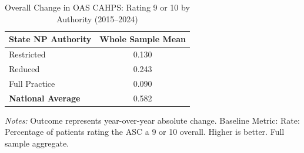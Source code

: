 \begin{table}[htbp]
    \centering
    \caption{Overall Change in OAS CAHPS: Rating 9 or 10 by Authority (2015--2024)}
    \label{tab:d_oas_rating_9_10_full}
    \vspace{0.2cm}
    \begin{tabular}{lc}
        \toprule
        \textbf{State NP Authority} & \textbf{Whole Sample Mean} \\
        \midrule
        Restricted & 0.130 \\
        Reduced & 0.243 \\
        Full Practice & 0.090 \\
        \midrule
        \textbf{National Average} & 0.582 \\
        \bottomrule
    \end{tabular}
    \vspace{0.1cm}
    \begin{minipage}{0.6\textwidth}
        \footnotesize \textit{Notes:} Outcome represents year-over-year absolute change. Baseline Metric: Rate: Percentage of patients rating the ASC a 9 or 10 overall. Higher is better. Full sample aggregate.
    \end{minipage}
\end{table}